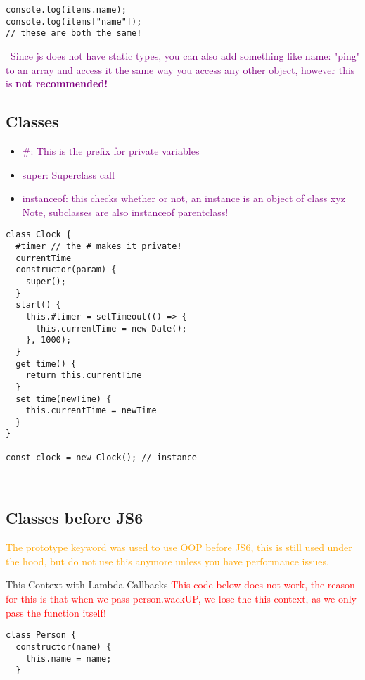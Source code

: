 \documentclass[main.tex,fontsize=6pt,paper=a4,paper=landscape,DIV=calc,]{scrartcl}
\begin{document}
\begin{multicols*}{4}
\begin{lstlisting}
console.log(items.name);
console.log(items["name"]);
// these are both the same!
\end{lstlisting}
\, \newline
\textcolor{purple}{Since js does not have static types, you can also add something like name: "ping" to an array and access it the same way you access any other object, however this is \textbf{not recommended!}}

\subsection{Classes} 

\begin{itemize}
\item \textcolor{purple}{\#: This is the prefix for private variables}
\item \textcolor{purple}{super: Superclass call}
\item \textcolor{purple}{instanceof: this checks whether or not,\newline
  an instance is an object of class xyz\newline
Note, subclasses are also instanceof parentclass!}
\end{itemize}
\begin{lstlisting}
class Clock {
  #timer // the # makes it private!
  currentTime
  constructor(param) {
    super();
  }
  start() {
    this.#timer = setTimeout(() => { 
      this.currentTime = new Date();
    }, 1000);
  }
  get time() {
    return this.currentTime
  }
  set time(newTime) {
    this.currentTime = newTime
  }
}

const clock = new Clock(); // instance
\end{lstlisting}
\, \newline

\subsection{Classes before JS6}  
\textcolor{orange}{The prototype keyword was used to use OOP before JS6, this is still used under the hood, but do not use this anymore unless you have performance issues.}

This Context with Lambda Callbacks 
\textcolor{red}{This code below does not work, the reason for this is that when we pass person.wackUP, we lose the this context, as we only pass the function itself!}\newline
\begin{lstlisting}
class Person {
  constructor(name) {
    this.name = name;
  }


\end{lstlisting}
\end{multicols*}
\end{document}
